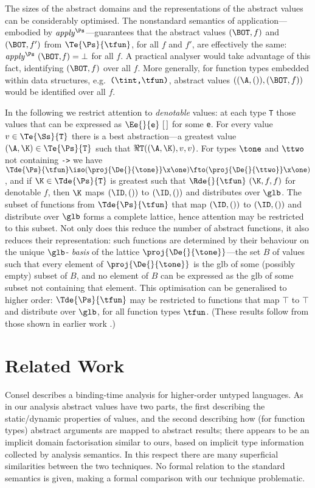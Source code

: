 \documentclass[11pt]{article}
\begin{document}
The sizes of the abstract domains and the representations of the
abstract values can be considerably optimised.  The nonstandard
semantics of application---embodied by $\it apply^{\Ps}$---guarantees
that the abstract values $(\BOT,f)$ and $(\BOT,f')$ from
$\Te{\Ps}{\tfun}$, for all $f$ and $f'$, are effectively the same:
$\it apply^{\Ps}~(\BOT,f)=\bot$ for all $f$.  A practical analyser
would take advantage of this fact, identifying $(\BOT,f)$ over all
$f$.  More generally, for function types embedded within data
structures, e.g.\ $\mbox{\tt (}\tint\mbox{\tt ,}\tfun\mbox{\tt )}$, abstract values
$((\A,()),(\BOT,f))$ would be identified over all $f$.

In the following we restrict attention to {\it denotable\/} values: at
each type \mbox{\tt T} those values that can be expressed as $\Ee{}{\mbox{\tt e}}~[\,]$
for some \mbox{\tt e}.  For every value $v\in\Te{\Ss}{\mbox{\tt T}}$ there is a best
abstraction---a greatest value $(\A,\K)\in\Te{\Ps}{\mbox{\tt T}}$ such that
$\Re{}{\mbox{\tt T}}((\A,\K),v,v)$.  For types $\tone$ and $\ttwo$ not
containing \mbox{\tt ->} we have
$\Tde{\Ps}{\tfun}\iso(\proj{\De{}{\tone}}\x\one)\fto(\proj{\De{}{\ttwo}}\x\one)$,
and if $\K\in\Tde{\Ps}{\mbox{\tt T}}$ is greatest such that
$\Rde{}{\tfun}~(\K,f,f)$ for denotable $f$, then $\K$ maps $(\ID,())$
to $(\ID,())$ and distributes over $\glb$.  The subset of functions
from $\Tde{\Ps}{\tfun}$ that map $(\ID,())$ to $(\ID,())$ and
distribute over $\glb$ forms a complete lattice, hence attention may
be restricted to this subset.  Not only does this reduce the number of
abstract functions, it also reduces their representation: such
functions are determined by their behaviour on the unique $\glb$-{\it
basis\/} of the lattice $\proj{\De{}{\tone}}$---the set $B$ of values
such that every element of $\proj{\De{}{\tone}}$ is the glb of some
(possibly empty) subset of $B$, and no element of $B$ can be expressed
as the glb of some subset not containing that element.  This
optimisation can be generalised to higher order: $\Tde{\Ps}{\tfun}$
may be restricted to functions that map $\top$ to $\top$ and
distribute over $\glb$, for all function types $\tfun$.  (These
results follow from those shown in earlier work \cite{Dav94}.)

\section{Related Work}

Consel \cite{Con90} describes a binding-time analysis for higher-order
untyped languages.  As in our analysis abstract values have two parts,
the first describing the static/dynamic properties of values, and the
second describing how (for function types) abstract arguments are
mapped to abstract results; there appears to be an implicit domain
factorisation similar to ours, based on implicit type information
collected by analysis semantics.  In this respect there are many
superficial similarities between the two techniques.  No formal
relation to the standard semantics is given, making a formal
comparison with our technique problematic.
\end{document}
